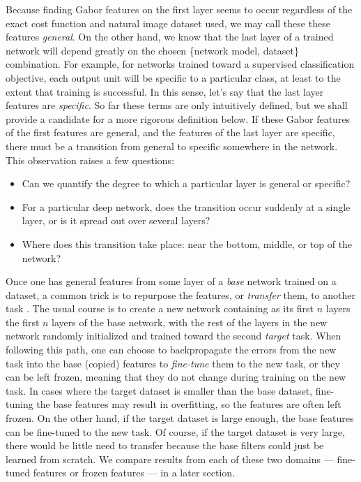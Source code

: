 Because finding Gabor features on the first layer seems to occur regardless of the exact cost function and natural image dataset used, we may call these these features \emph{general}. On the other hand, we know that the last layer of a trained network will depend greatly on the chosen \{network model, dataset\} combination. For example, for networks trained toward a supervised classification objective, each output unit will be specific to a particular class, at least to the extent that training is successful. In this sense, let's say that the last layer features are \emph{specific}. So far these terms are only intuitively defined, but we shall provide a candidate for a more rigorous definition below. 
If these Gabor features of the first features are general, and the features of the last layer are specific, there must be a transition from general to specific somewhere in the network. This observation raises a few questions:

\begin{itemize}
	\item Can we quantify the degree to which a particular layer is general or specific?
	\item For a particular deep network, does the transition occur suddenly at a single layer, or is it spread out over several layers?
	\item Where does this transition take place: near the bottom, middle, or top of the network?
\end{itemize}

Once one has general features from some layer of a \emph{base} network trained on a dataset, a common trick is to repurpose the features, or \emph{transfer} them, to another task \citep{caruana95,Bengio+al-AI-2011-small,UTLC+DL+tutorial-2011-small,donahue+jia-2013-arxiv}. The usual course is to create a new network containing as its first $n$ layers the first $n$ layers of the base network, with the rest of the layers in the new network randomly initialized and trained toward the second \emph{target} task. When following this path, one can choose to backpropagate the errors from the new task into the base (copied) features to \emph{fine-tune} them to the new task, or they can be left frozen, meaning that they do not change during training on the new task. In cases where the target dataset is smaller than the base dataset, fine-tuning the base features may result in overfitting, so the features are often left frozen. On the other hand, if the target dataset is large enough, the base features can be fine-tuned to the new task. Of course, if the target dataset is very large, there would be little need to transfer because the base filters could just be learned from scratch. We compare results from each of these two domains --- fine-tuned features or frozen features --- in a later section.

